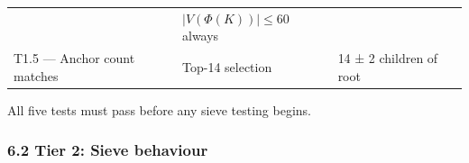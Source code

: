 \documentclass[
  11pt,
]{article}
\begin{document}
\begin{longtable}[]{@{}lll@{}}
\begin{minipage}[t]{0.24\columnwidth}
\end{minipage} & \begin{minipage}[t]{0.49\columnwidth}\raggedright
\(|V(\Phi(K))| \le 60\) always\strut
\end{minipage}\tabularnewline
\begin{minipage}[t]{0.18\columnwidth}\raggedright
T1.5 --- Anchor count matches\strut
\end{minipage} & \begin{minipage}[t]{0.24\columnwidth}\raggedright
Top-14 selection\strut
\end{minipage} & \begin{minipage}[t]{0.49\columnwidth}\raggedright
14 ± 2 children of root\strut
\end{minipage}\tabularnewline
\bottomrule
\end{longtable}

All five tests must pass before any sieve testing begins.

\hypertarget{tier-2-sieve-behaviour}{%
\subsubsection{6.2 Tier 2: Sieve
behaviour}\label{tier-2-sieve-behaviour}}
\end{document}
